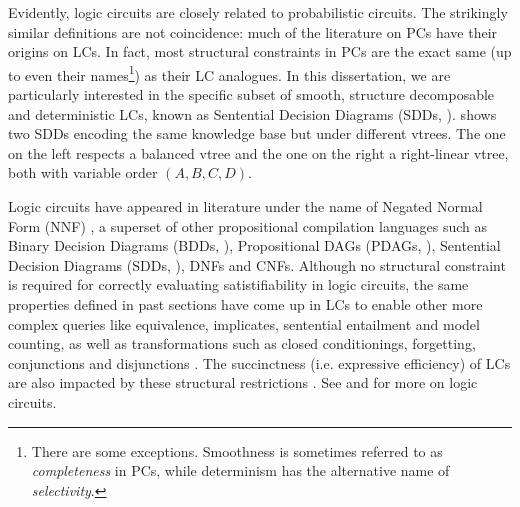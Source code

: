 Evidently, logic circuits are closely related to probabilistic circuits. The strikingly similar
definitions are not coincidence: much of the literature on PCs have their origins on LCs. In fact,
most structural constraints in PCs are the exact same (up to even their names\footnote{There are
some exceptions. Smoothness is sometimes referred to as \emph{completeness} in PCs, while
determinism has the alternative name of \emph{selectivity}.}) as their LC analogues. In this
dissertation, we are particularly interested in the specific subset of smooth, structure
decomposable and deterministic LCs, known as Sentential Decision Diagrams (SDDs,
\cite{darwiche11}).  shows two SDDs encoding the same knowledge base but under
different vtrees. The one on the left respects a balanced vtree and the one on the right a
right-linear vtree, both with variable order $(A,B,C,D)$.

Logic circuits have appeared in literature under the name of Negated Normal Form (NNF)
\citep{darwiche01b,darwiche99}, a superset of other propositional compilation languages such as
Binary Decision Diagrams (BDDs, \cite{bryant86}), Propositional DAGs (PDAGs, \cite{wachter06}),
Sentential Decision Diagrams (SDDs, \cite{darwiche11}), DNFs and CNFs. Although no structural
constraint is required for correctly evaluating satistifiability in logic circuits, the same
properties defined in past sections have come up in LCs to enable other more complex queries like
equivalence, implicates, sentential entailment and model counting, as well as transformations such
as closed conditionings, forgetting, conjunctions and disjunctions \citep{darwiche02}. The
succinctness (i.e. expressive efficiency) of LCs are also impacted by these structural restrictions
\citep{gogic95,papadimitriou94,darwiche02}.  See \citet{darwiche02} and \citet{darwiche20} for more
on logic circuits.

